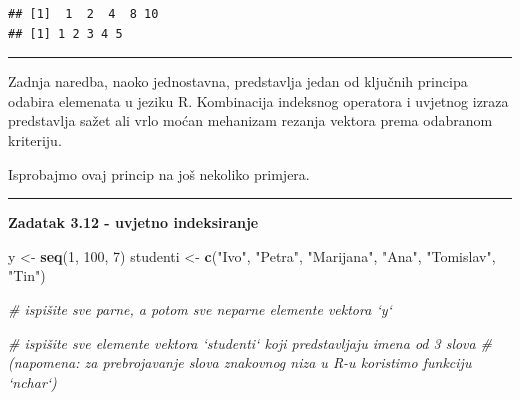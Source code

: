\documentclass[]{book}
\newenvironment{Shaded}{\begin{snugshade}}{\end{snugshade}}
\newcommand{\KeywordTok}[1]{\textcolor[rgb]{0.13,0.29,0.53}{\textbf{#1}}}
\newcommand{\DecValTok}[1]{\textcolor[rgb]{0.00,0.00,0.81}{#1}}
\newcommand{\StringTok}[1]{\textcolor[rgb]{0.31,0.60,0.02}{#1}}
\newcommand{\CommentTok}[1]{\textcolor[rgb]{0.56,0.35,0.01}{\textit{#1}}}
\newcommand{\NormalTok}[1]{#1}
\theoremstyle{definition}
\theoremstyle{definition}
\theoremstyle{definition}
\theoremstyle{remark}
\begin{document}
\begin{verbatim}
## [1]  1  2  4  8 10
## [1] 1 2 3 4 5
\end{verbatim}

\begin{center}\rule{0.5\linewidth}{\linethickness}\end{center}

Zadnja naredba, naoko jednostavna, predstavlja jedan od ključnih
principa odabira elemenata u jeziku R. Kombinacija indeksnog operatora i
uvjetnog izraza predstavlja sažet ali vrlo moćan mehanizam rezanja
vektora prema odabranom kriteriju.

Isprobajmo ovaj princip na još nekoliko primjera.

\begin{center}\rule{0.5\linewidth}{\linethickness}\end{center}

\textbf{Zadatak 3.12 - uvjetno indeksiranje}

\begin{Shaded}
\begin{Highlighting}[]
\NormalTok{y <-}\StringTok{ }\KeywordTok{seq}\NormalTok{(}\DecValTok{1}\NormalTok{, }\DecValTok{100}\NormalTok{, }\DecValTok{7}\NormalTok{)}
\NormalTok{studenti <-}\StringTok{ }\KeywordTok{c}\NormalTok{(}\StringTok{"Ivo"}\NormalTok{, }\StringTok{"Petra"}\NormalTok{, }\StringTok{"Marijana"}\NormalTok{, }\StringTok{"Ana"}\NormalTok{, }\StringTok{"Tomislav"}\NormalTok{, }\StringTok{"Tin"}\NormalTok{)}

\CommentTok{# ispišite sve parne, a potom sve neparne elemente vektora `y`}

\CommentTok{# ispišite sve elemente vektora `studenti` koji predstavljaju imena od 3 slova}
\CommentTok{# (napomena: za prebrojavanje slova znakovnog niza u R-u koristimo funkciju `nchar`)}
\end{Highlighting}
\end{Shaded}
\end{document}

